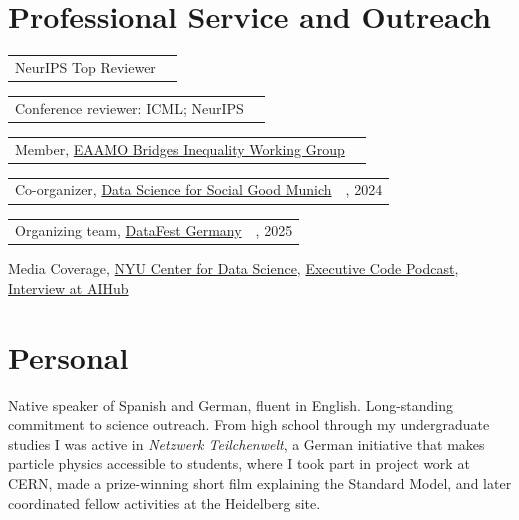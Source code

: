 \documentclass[10pt,letterpaper]{article}
\makeatletter
\newcommand{\cvline}[2]{%
  \begin{tabularx}{\textwidth}{@{}X>{\raggedleft\arraybackslash}p{1.48in}@{}}
    #1 & #2
  \end{tabularx}
}
\makeatother
\begin{document}
\section{Professional Service and Outreach}

\cvline{NeurIPS Top Reviewer}{2026}
\cvline{Conference reviewer: ICML; NeurIPS}{}
\cvline{Member, \href{https://bridges.eaamo.org/working_groups/inequality/}{EAAMO Bridges Inequality Working Group}}{2026}
\cvline{Co-organizer, \href{https://www.dssgxmunich.org}{Data Science for Social Good Munich}}{2023, 2024}
\cvline{Organizing team, \href{https://sites.google.com/view/datafest-lmu-2025/home}{DataFest Germany}}{2023, 2025}
Media Coverage, \href{https://nyudatascience.medium.com/helping-the-worst-off-when-hiring-more-case-workers-beats-building-better-ai-12e6f968de0b}{NYU Center for Data Science}, \href{https://open.spotify.com/episode/0UyhJ1wmxUQ5afI6jnql85?si=2366cf2f93e946f7&nd=1&dlsi=d30df75f137740b1}{Executive Code Podcast}, \href{https://aihub.org/2025/08/27/the-value-of-prediction-in-identifying-the-worst-off-interview-with-unai-fischer-abaigar/}{Interview at AIHub}

\section{Personal}

Native speaker of Spanish and German, fluent in English. Long-standing commitment to science outreach. From high school through my undergraduate studies I was active in \emph{Netzwerk Teilchenwelt}, a German initiative that makes particle physics accessible to students, where I took part in project work at CERN, made a prize-winning short film explaining the Standard Model, and later coordinated fellow activities at the Heidelberg site.
\end{document}
